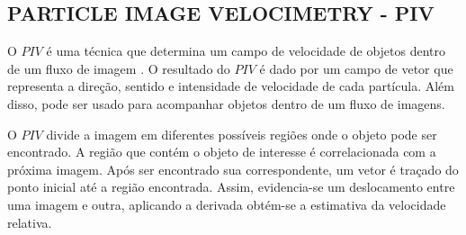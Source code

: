 \subsection{PARTICLE IMAGE VELOCIMETRY - PIV}

O $PIV$ é uma técnica que determina um campo de velocidade de objetos dentro de um fluxo de imagem \cite{Bastiaans}.
O resultado do $PIV$ é dado por um campo de vetor que representa a direção, sentido e intensidade de velocidade de cada 
partícula. Além disso, pode ser usado para acompanhar objetos dentro de um fluxo de imagens.

O $PIV$ divide a imagem em diferentes possíveis regiões onde o objeto pode ser encontrado. A região que contém o objeto de 
interesse é correlacionada com a próxima imagem. Após ser encontrado sua correspondente, um vetor é traçado do ponto inicial
até a região encontrada. Assim, evidencia-se um deslocamento entre uma imagem e outra, aplicando a derivada 
obtém-se a estimativa da velocidade relativa.

